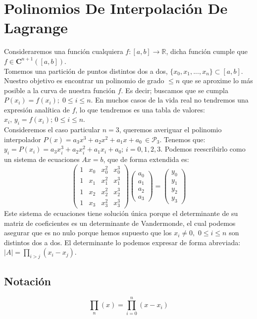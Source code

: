 \documentclass[12pt,a4paper,oneside]{scrbook}
\newcounter{ns}
\begin{document}
\section{Polinomios De Interpolación De Lagrange}
Consideraremos una función cualquiera $f:[a,b]\rightarrow\mathbb{R}$, dicha función cumple que $f\in\mathbf{C}^{n+1}([a,b])$.\\
Tomemos una partición de puntos distintos dos a dos, $\{ x_0,x_1,...,x_n \} \subset [a,b]$.\\
Nuestro objetivo es encontrar un polinomio de grado $\leq n$ que se aproxime lo más posible a la curva de nuestra función $f$. Es decir; buscamos que se cumpla $P(x_i)=f(x_i);\;0\leq i\leq n$. En muchos casos de la vida real no tendremos una expresión analítica de $f$, lo que tendremos es una tabla de valores: $x_i,\, y_i=f(x_i);\, 0\leq i\leq n$.\\
Consideremos el caso particular $n=3$, queremos averiguar el polinomio interpolador $P(x)=a_3x^3+a_2x^2+a_1x+a_0\,\in\mathcal{P}_3$. Tenemos que: $y_i=P(x_i)=a_3x_i^3+a_2x_i^2+a_1x_i+a_0;\,i=0,1,2,3$. Podemos reescribirlo como un sistema de ecuaciones $Ax=b$, que de forma extendida es:
$$
\begin{pmatrix}
   1 & x_0 & x_0^2 & x_0^3  \\
   1 & x_1 & x_1^2 & x_1^3 \\
   1 & x_2 & x_2^2 & x_2^3 \\
   1 & x_3 & x_3^2 & x_3^3
\end{pmatrix}
\begin{pmatrix}
a_0\\ a_1\\a_2\\a_3
\end{pmatrix}=
\begin{pmatrix}
y_0\\ y_1\\ y_2\\ y_3
\end{pmatrix}
$$
Este sistema de ecuaciones tiene solución única porque el determinante de su matriz de coeficientes es un determinante de Vandermonde, el cual podemos asegurar que es no nulo porque hemos supuesto que los $x_i\neq 0,\,\, 0\leq i\leq n$ son distintos dos a dos. El determinante lo podemos expresar de forma abreviada: $|A|=\prod\limits_{i>j} (x_i - x_j)$.
\subsection*{Notación}
$$
\prod_n(x)=\prod_{i=0}^n (x-x_i)
$$
\end{document}
